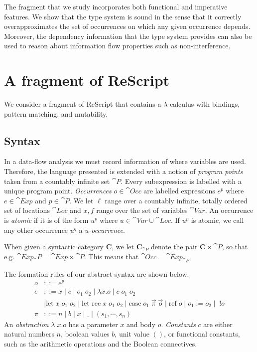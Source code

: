 \documentclass{llncs}
\newcommand{\refc}{\ensuremath{\textrm{ref}\xspace}}
\begin{document}
The fragment that we study incorporates both functional and imperative
features. We show that the type system is sound in the sense that
it correctly overapproximates the set of occurrences on which any
given occurrence depends. Moreover, the dependency information that
the type system provides can also be used to reason about information
flow properties such as non-interference.

\section{A fragment of ReScript}\label{sec:lang}

We consider a fragment of ReScript that contains a $\lambda$-calculus
with bindings, pattern matching, and mutability.
 
\subsection{Syntax}

In a data-flow analysis we must record information of where variables
are used.  Therefore, the language presented is extended with a notion
of \emph{program points} taken from a countably infinite set
$\cat{P}$.
%
Every subexpression is labelled with a unique program
point. \emph{Occurrences} $o \in \cat{Occ}$ are labelled expressions
$e^p$ where $e \in \cat{Exp}$ and $p \in \cat{P}$. We let $\ell$ range
over a countably infinite, totally ordered set of locations
$\cat{Loc}$ and $x,f$ range over the set of variables $\cat{Var}$.  An
occurrence is \emph{atomic} if it is of the form $u^p$ where
$u \in \cat{Var} \cup \cat{Loc}$. If $u^p$ is atomic, we call any
other occurrence $u^q$ a \emph{$u$-occurrence}.

When given a syntactic category $\mathbf{C}$, we let
$\mathbf{C}_{\cat{P}}$ denote the pair $\mathbf{C}\times\cat{P}$, so
that e.g.  $\cat{Exp}_\cat{P}=\cat{Exp}\times\cat{P}$.  This means
that $\cat{Occ}=\cat{Exp}_{\cat{P}}$.

The formation rules of our abstract syntax are shown below.
%
\begin{align*}
o &::= e^p \\
e &::= x \mid c \mid o_1\;o_2 \mid \lambda x.o \mid c \; o_1 \; o_2\\
			& \mid \mbox{let} \; x \; o_1 \; o_2 \mid
                   \mbox{let rec} \; x \; o_1 \; o_2 \mid \mbox{case}
                   \; o_1 \; \vec{\pi} \; \vec{o} \mid  \refc \; o \mid o_1 := o_2 \mid \; !o\\
\pi &::= n \mid b \mid x \mid \_  \mid
                                (s_1,\cdots,s_n)
\end{align*}
%
An \emph{abstraction} $\lambda\;x.o$ has a parameter $x$ and
body $o$.  \emph{Constants} $c$ are either natural numbers $n$,
boolean values $b$, unit value $()$, or functional constants, such as
the arithmetic operations and the Boolean connectives.
\end{document}
